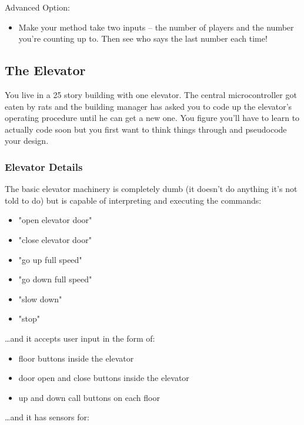 \documentclass[11pt]{article}
\begin{document}
Advanced Option:

\begin{itemize}
\item Make your method take two inputs -- the number of players and the number 
you're counting up to. Then see who says the last number each time!
\end{itemize}




\subsection{The Elevator}
\label{sec-2-1}

You live in a 25 story building with one elevator. The central 
microcontroller got eaten by rats and the building manager has asked you to 
code up the elevator's operating procedure until he can get a new one. You 
figure you'll have to learn to actually code soon but you first want to think
things through and pseudocode your design.

\subsubsection{Elevator Details}
\label{sec-2-1-1}

The basic elevator machinery is completely dumb (it doesn't do anything it's
not told to do) but is capable of interpreting and executing the commands:

\begin{itemize}
\item "open elevator door"
\item "close elevator door"
\item "go up full speed"
\item "go down full speed"
\item "slow down"
\item "stop"
\end{itemize}


\ldots{}and it accepts user input in the form of:

\begin{itemize}
\item floor buttons inside the elevator
\item door open and close buttons inside the elevator
\item up and down call buttons on each floor
\end{itemize}


\ldots{}and it has sensors for:
\end{document}
